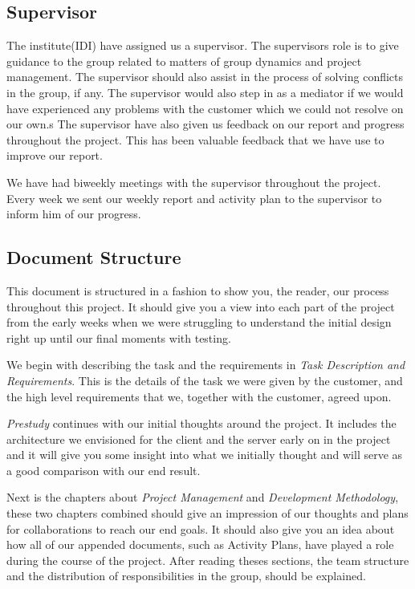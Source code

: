     
    \subsection{Supervisor}\label{Supervisor}
    
    The institute(IDI) have assigned us a supervisor. The supervisors role is to give guidance to the group related to matters of group dynamics and project management. The supervisor should also assist in the process of solving conflicts in the group, if any. The supervisor would also step in as a mediator if we would have experienced any problems with the customer which we could not resolve on our own.s The supervisor have also given us feedback on our report and progress throughout the project. This has been valuable feedback that we have use to improve our report.  
    
    We have had biweekly meetings with the supervisor throughout the project. Every week we sent our weekly report and activity plan to the supervisor to inform him of our progress. 
    
    
    \subsection{Document Structure}\label{Document Structure}
    This document is structured in a fashion to show you, the reader, our process throughout this project. It should give you a view into each part of the project from the early weeks when we were struggling to understand the initial design right up until our final moments with testing. 
    
    We begin with describing the task and the requirements in \emph{Task Description and Requirements}. This is the details of the task we were given by the customer, and the high level requirements that we, together with the customer, agreed upon.
    
    \emph{Prestudy} continues with our initial thoughts around the project. It includes the architecture we envisioned for the client and the server early on in the project and it will give you some insight into what we initially thought and will serve as a good comparison with our end result.
    
    Next is the chapters about \emph{Project Management} and \emph{Development Methodology}, these two chapters combined should give an impression of our thoughts and plans for collaborations to reach our end goals. It should also give you an idea about how all of our appended documents, such as Activity Plans, have played a role during the course of the project. After reading theses sections, the team structure and the distribution of responsibilities in the group, should be explained.
    
